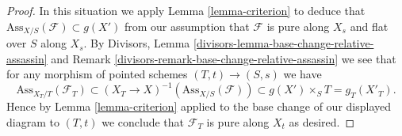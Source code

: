 \begin{proof}
\medskip\noindent
In this situation we apply
Lemma \ref{lemma-criterion}
to deduce that $\text{Ass}_{X/S}(\mathcal{F}) \subset g(X')$
from our assumption that $\mathcal{F}$ is pure along $X_s$
and flat over $S$ along $X_s$. By
Divisors, Lemma \ref{divisors-lemma-base-change-relative-assassin} and
Remark \ref{divisors-remark-base-change-relative-assassin}
we see that for any morphism of pointed schemes
$(T, t) \to (S, s)$ we have
$$
\text{Ass}_{X_T/T}(\mathcal{F}_T) \subset
(X_T \to X)^{-1}(\text{Ass}_{X/S}(\mathcal{F})) \subset
g(X') \times_S T = g_T(X'_T).
$$
Hence by
Lemma \ref{lemma-criterion}
applied to the base change of our displayed diagram to $(T, t)$
we conclude that $\mathcal{F}_T$ is pure along $X_t$ as desired.
\end{proof}
